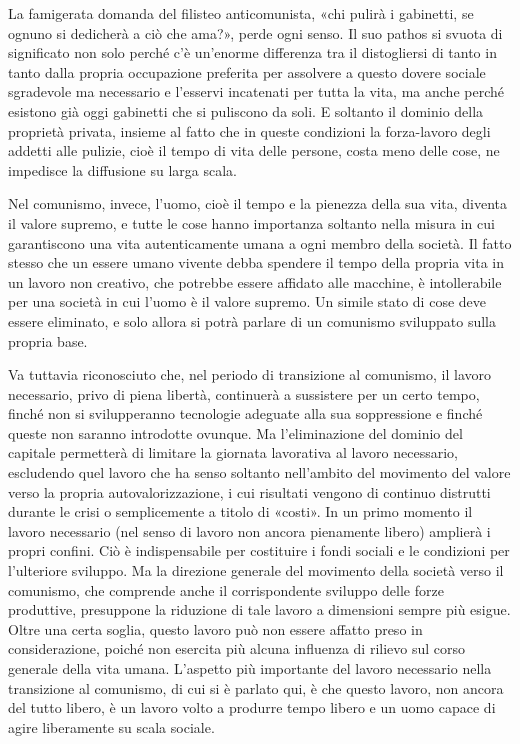 \documentclass[../main]{subfiles}
\begin{document}
La famigerata domanda del filisteo anticomunista, «chi pulirà i gabinetti, se ognuno si dedicherà a ciò che ama?», perde ogni senso. Il suo pathos si svuota di significato non solo perché c'è un'enorme differenza tra il distogliersi di tanto in tanto dalla propria occupazione preferita per assolvere a questo dovere sociale sgradevole ma necessario e l'esservi incatenati per tutta la vita, ma anche perché esistono già oggi gabinetti che si puliscono da soli. E soltanto il dominio della proprietà privata, insieme al fatto che in queste condizioni la forza-lavoro degli addetti alle pulizie, cioè il tempo di vita delle persone, costa meno delle cose, ne impedisce la diffusione su larga scala.

Nel comunismo, invece, l'uomo, cioè il tempo e la pienezza della sua vita, diventa il valore supremo, e tutte le cose hanno importanza soltanto nella misura in cui garantiscono una vita autenticamente umana a ogni membro della società. Il fatto stesso che un essere umano vivente debba spendere il tempo della propria vita in un lavoro non creativo, che potrebbe essere affidato alle macchine, è intollerabile per una società in cui l'uomo è il valore supremo. Un simile stato di cose deve essere eliminato, e solo allora si potrà parlare di un comunismo sviluppato sulla propria base.

Va tuttavia riconosciuto che, nel periodo di transizione al comunismo, il lavoro necessario, privo di piena libertà, continuerà a sussistere per un certo tempo, finché non si svilupperanno tecnologie adeguate alla sua soppressione e finché queste non saranno introdotte ovunque. Ma l'eliminazione del dominio del capitale permetterà di limitare la giornata lavorativa al lavoro necessario, escludendo quel lavoro che ha senso soltanto nell'ambito del movimento del valore verso la propria autovalorizzazione, i cui risultati vengono di continuo distrutti durante le crisi o semplicemente a titolo di «costi». In un primo momento il lavoro necessario (nel senso di lavoro non ancora pienamente libero) amplierà i propri confini. Ciò è indispensabile per costituire i fondi sociali e le condizioni per l'ulteriore sviluppo. Ma la direzione generale del movimento della società verso il comunismo, che comprende anche il corrispondente sviluppo delle forze produttive, presuppone la riduzione di tale lavoro a dimensioni sempre più esigue. Oltre una certa soglia, questo lavoro può non essere affatto preso in considerazione, poiché non esercita più alcuna influenza di rilievo sul corso generale della vita umana. L'aspetto più importante del lavoro necessario nella transizione al comunismo, di cui si è parlato qui, è che questo lavoro, non ancora del tutto libero, è un lavoro volto a produrre tempo libero e un uomo capace di agire liberamente su scala sociale.
\end{document}
